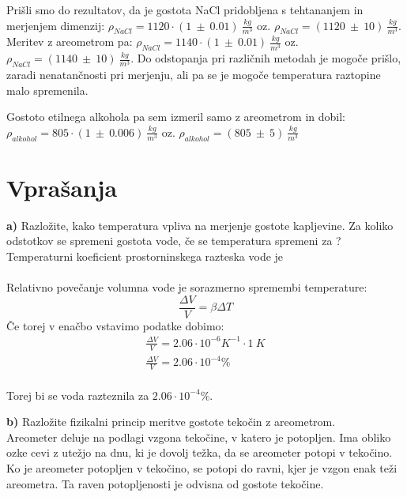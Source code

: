 \documentclass{report}
\begin{document}
Prišli smo do rezultatov, da je gostota NaCl pridobljena s tehtananjem in merjenjem dimenzij: 
$ \rho_{NaCl} = 1120 \cdot (1 \ \pm \ 0.01) \ \frac{kg}{m^3} $ oz. $ \rho_{NaCl} = (1120 \ \pm \ 10) \ \frac{kg}{m^3} $.
 Meritev z areometrom pa: $ \rho_{NaCl} = 1140 \cdot (1 \ \pm \ 0.01) \ \frac{kg}{m^3}$ oz. 
 $ \rho_{NaCl} = (1140 \ \pm \ 10) \ \frac{kg}{m^3} $. Do odstopanja pri različnih metodah je mogoče prišlo, 
 zaradi nenatančnosti pri merjenju, ali pa se je mogoče temperatura raztopine malo spremenila.

\medskip

\noindent Gostoto etilnega alkohola pa sem izmeril samo z areometrom in dobil: 
$ \rho_{alkohol} = 805 \cdot (1 \ \pm \ 0.006) \ \frac{kg}{m^3} $ oz. $ \rho_{alkohol} = (805 \ \pm \ 5) \ \frac{kg}{m^3} $


\pagebreak
\section{Vprašanja}
\textbf{a)} Razložite, kako temperatura vpliva na merjenje gostote 
kapljevine. Za koliko odstotkov se spremeni gostota vode, če se 
temperatura spremeni za ? Temperaturni koeficient prostorninskega 
razteska vode je 
\\\\
Relativno povečanje volumna vode je sorazmerno spremembi temperature:
\begin{equation}
  \frac{\Delta V}{V} = \beta \Delta T
\end{equation}
Če torej v enačbo vstavimo podatke dobimo:
\begin{equation}
  \label{eq:1}
  \begin{gathered}
    \frac{\Delta V}{V} = 2.06 \cdot 10^{-6}K^{-1} \cdot 1 \ K \\
    \frac{\Delta V}{V} = 2.06 \cdot 10^{-4} \%
  \end{gathered}
\end{equation}
\\

\noindent Torej bi se voda razteznila za $2.06 \cdot 10^{-4} \%$.

\bigskip


\noindent
\textbf{b)} Razložite fizikalni princip meritve gostote tekočin z areometrom. \\

\noindent
Areometer deluje na podlagi vzgona tekočine, v katero je potopljen.
Ima obliko ozke cevi z utežjo na dnu, ki je dovolj težka, da se areometer potopi v tekočino. 
Ko je areometer potopljen v tekočino, se potopi do ravni, kjer je vzgon enak teži areometra. 
Ta raven potopljenosti je odvisna od gostote tekočine.
\end{document}
